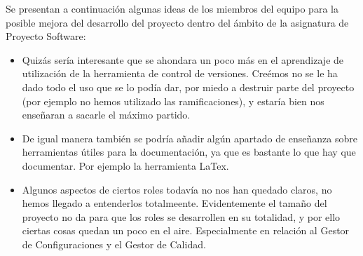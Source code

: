 Se presentan a continuación algunas ideas de los miembros del equipo para la posible mejora del desarrollo del proyecto dentro del ámbito de la asignatura de Proyecto Software:

\begin{itemize}
	\item Quizás sería interesante que se ahondara un poco más en el aprendizaje de utilización de la herramienta de control de versiones. Creémos no se le ha dado todo el uso que se lo podía dar, por miedo a destruir parte del proyecto (por ejemplo no hemos utilizado las ramificaciones), y estaría bien nos enseñaran a sacarle el máximo partido.
	
	\item De igual manera también se podría añadir algún apartado de enseñanza sobre herramientas útiles para la documentación, ya que es bastante lo que hay que documentar. Por ejemplo la herramienta LaTex.
	
	\item Algunos aspectos de ciertos roles todavía no nos han quedado claros, no hemos llegado a entenderlos totalmeente. Evidentemente el tamaño del proyecto no da para que los roles se desarrollen en su totalidad, y por ello ciertas cosas quedan un poco en el aire. Especialmente en relación al Gestor de Configuraciones y el Gestor de Calidad.
	
\end{itemize}